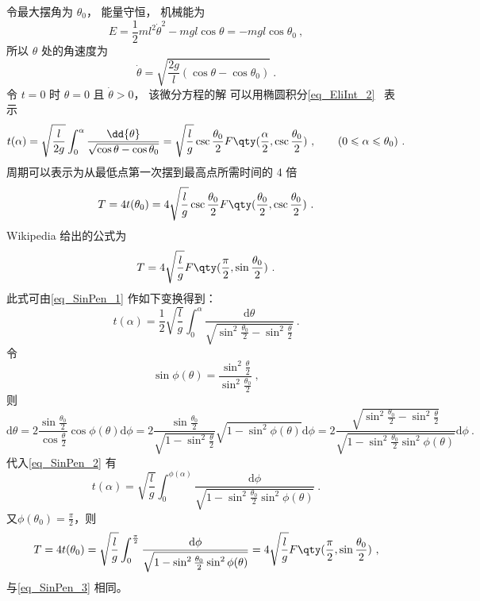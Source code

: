 

令最大摆角为 $\theta_0$， 能量守恒， 机械能为
\begin{equation}
E = \frac{1}{2} m l^2 \dot \theta^2 - mg l \cos\theta = - mg l \cos\theta_0~,
\end{equation}
所以 $\theta$ 处的角速度为
\begin{equation}
\dot{\theta} = \sqrt{\frac{2g}{l} (\cos\theta - \cos\theta_0) }~.
\end{equation}
令 $t = 0$ 时 $\theta = 0$ 且 $\dot{\theta} > 0$， 该微分方程的解%
可以用椭圆积分\autoref{eq_EliInt_2}~ 表示
\begin{equation}\label{eq_SinPen_1}
t(\alpha) = \sqrt{\frac{l}{2g}} \int_0^{\alpha} \frac{\dd{\theta}}{\sqrt{\cos\theta - \cos\theta_0}}
= \sqrt{\frac{l}{g}} \csc\frac{\theta_0}{2} F\qty(\frac{\alpha}{2}, \csc\frac{\theta_0}{2})~,
\qquad (0 \leqslant \alpha \leqslant \theta_0)~.
\end{equation}
周期可以表示为从最低点第一次摆到最高点所需时间的 4 倍
\begin{equation}
T = 4t(\theta_0) = 4 \sqrt{\frac{l}{g}} \csc\frac{\theta_0}{2} F\qty(\frac{\theta_0}{2}, \csc\frac{\theta_0}{2})~.
\end{equation}
Wikipedia 给出的公式为
\begin{equation}\label{eq_SinPen_3}
T = 4 \sqrt{\frac{l}{g}} F\qty(\frac{\pi}{2}, \sin\frac{\theta_0}{2})~.
\end{equation}
此式可由\autoref{eq_SinPen_1} 作如下变换得到：
\begin{equation}\label{eq_SinPen_2}
t(\alpha)=\frac12\sqrt{\frac{l}{g}}\int_{0}^{\alpha}\frac{\mathrm{d}\theta}{\sqrt{\sin^2\frac{\theta_0}2-\sin^2\frac{\theta}2}}~.
\end{equation}
令
\begin{equation}
\sin \phi(\theta)=\frac{\sin^2\frac{\theta}2}{\sin^2\frac{\theta_0}2}~,
\end{equation}
则
\begin{equation}
\mathrm d\theta=2\frac{\sin\frac{\theta_0}2}{\cos\frac{\theta}2}\cos\phi(\theta)\mathrm d\phi
=2\frac{\sin\frac{\theta_0}2}{\sqrt{1-\sin^2\frac{\theta}2}}\sqrt{1-\sin^2\phi(\theta)}\mathrm d\phi
=2\frac{\sqrt{\sin^2\frac{\theta_0}2-\sin^2\frac{\theta}2}}{\sqrt{1-\sin^2\frac{\theta_0}2\sin^2{\phi(\theta)}}}\mathrm d\phi~.
\end{equation}
代入\autoref{eq_SinPen_2} 有
\begin{equation}
t(\alpha)=\sqrt{\frac{l}{g}}\int_{0}^{\phi(\alpha)}\frac{\mathrm{d}\phi}{\sqrt{1-\sin^2\frac{\theta_0}2\sin^2{\phi(\theta)}}}~.
\end{equation}
又$\phi(\theta_0)=\frac\pi2$，则
\begin{equation}
T=4t(\theta_0)=\sqrt{\frac{l}{g}}\int_{0}^{\frac\pi2}\frac{\mathrm{d}\phi}{\sqrt{1-\sin^2\frac{\theta_0}2\sin^2{\phi(\theta)}}}=4 \sqrt{\frac{l}{g}} F\qty(\frac{\pi}{2}, \sin\frac{\theta_0}{2})~,
\end{equation}
与\autoref{eq_SinPen_3} 相同。


